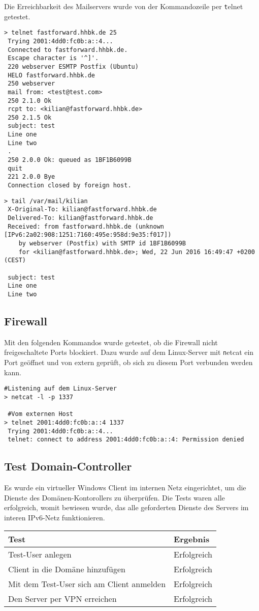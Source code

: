 Die Erreichbarkeit des Mailservers wurde von der Kommandozeile per {\texttt telnet} getestet.\newline

\begin{lstlisting}[numbers=none]
> telnet fastforward.hhbk.de 25
 Trying 2001:4dd0:fc0b:a::4...
 Connected to fastforward.hhbk.de.
 Escape character is '^]'.
 220 webserver ESMTP Postfix (Ubuntu)
 HELO fastforward.hhbk.de
 250 webserver
 mail from: <test@test.com>
 250 2.1.0 Ok
 rcpt to: <kilian@fastforward.hhbk.de>
 250 2.1.5 Ok
 subject: test
 Line one
 Line two
 .
 250 2.0.0 Ok: queued as 1BF1B6099B
 quit
 221 2.0.0 Bye
 Connection closed by foreign host.
\end{lstlisting}

\begin{lstlisting}[numbers=none]
> tail /var/mail/kilian 
 X-Original-To: kilian@fastforward.hhbk.de
 Delivered-To: kilian@fastforward.hhbk.de
 Received: from fastforward.hhbk.de (unknown [IPv6:2a02:908:1251:7160:495e:958d:9e35:f017])
	by webserver (Postfix) with SMTP id 1BF1B6099B
	for <kilian@fastforward.hhbk.de>; Wed, 22 Jun 2016 16:49:47 +0200 (CEST)

 subject: test
 Line one
 Line two
\end{lstlisting}

\subsection{Firewall}

Mit den folgenden Kommandos wurde getestet, ob die Firewall nicht freigeschaltete Ports blockiert. Dazu wurde auf dem Linux-Server mit {\texttt netcat} ein Port geöffnet und von extern geprüft, ob sich zu diesem Port verbunden werden kann.\newline

\begin{lstlisting}[numbers=none]
 #Listening auf dem Linux-Server
> netcat -l -p 1337

 #Vom externen Host
> telnet 2001:4dd0:fc0b:a::4 1337
 Trying 2001:4dd0:fc0b:a::4...
 telnet: connect to address 2001:4dd0:fc0b:a::4: Permission denied
\end{lstlisting}

\subsection{Test Domain-Controller}

Es wurde ein virtueller Windows Client im internen Netz eingerichtet, um die Dienste des Domänen-Kontorollers zu überprüfen. Die Tests waren alle erfolgreich, womit bewiesen wurde, das alle geforderten Dienste des Servers im interen IPv6-Netz funktionieren.\newline

\noindent \begin{tabular}{|l|l|}
\hline
Test & Ergebnis \\
\hline
Test-User anlegen & Erfolgreich \\
Client in die Domäne hinzufügen & Erfolgreich \\
Mit dem Test-User sich am Client anmelden & Erfolgreich \\
Den Server per VPN erreichen & Erfolgreich \\
\hline
\end{tabular}